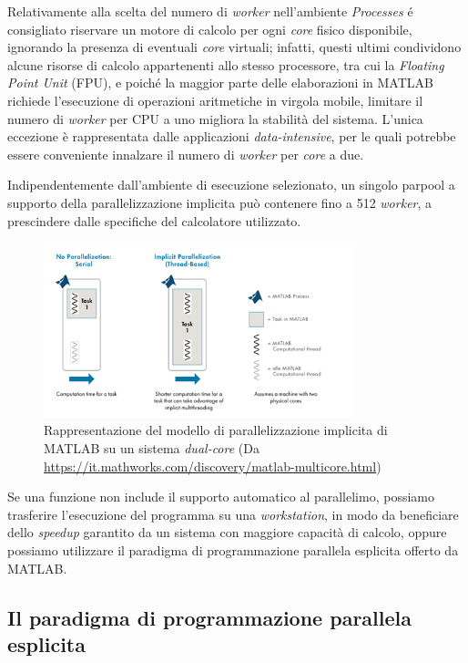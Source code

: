 Relativamente alla scelta del numero di \textit{worker} nell'ambiente \textit{Processes} \'e consigliato riservare un motore di calcolo per ogni \textit{core} 
fisico disponibile, ignorando la presenza di eventuali \textit{core} virtuali; infatti, questi ultimi condividono alcune risorse di calcolo appartenenti allo 
stesso processore, tra cui la \textit{Floating Point Unit} (FPU), e poich\'e la maggior parte delle elaborazioni in MATLAB richiede l'esecuzione di operazioni 
aritmetiche in virgola mobile, limitare il numero di \textit{worker} per CPU a uno migliora la stabilit\`a del sistema. \newline 
L'unica eccezione \`e rappresentata dalle applicazioni \textit{data-intensive}, per le quali potrebbe essere conveniente innalzare il numero di \textit{worker} per 
\textit{core} a due.

Indipendentemente dall'ambiente di esecuzione selezionato, un singolo parpool a supporto della parallelizzazione implicita pu\`o contenere fino a 512 \textit{worker}, a prescindere dalle specifiche 
del calcolatore utilizzato.
\begin{figure}[htbp]
    \centering
    \includegraphics[width=0.8\textwidth]{../Immagini/Capitolo 2/ImplicitParallelization.png}
    \caption{Rappresentazione del modello di parallelizzazione implicita di MATLAB su un sistema \textit{dual-core}
    \small{(Da \url{https://it.mathworks.com/discovery/matlab-multicore.html})}}
    \label{fig:ParallelismoImplicito}
\end{figure}\newline
Se una funzione non include il supporto automatico al parallelimo, possiamo trasferire l'esecuzione del programma su una \textit{workstation}, in modo da beneficiare 
dello \textit{speedup} garantito da un sistema con maggiore capacit\`a di calcolo, oppure possiamo utilizzare il paradigma di programmazione parallela esplicita offerto 
da MATLAB.

\subsection{Il paradigma di programmazione parallela esplicita}

